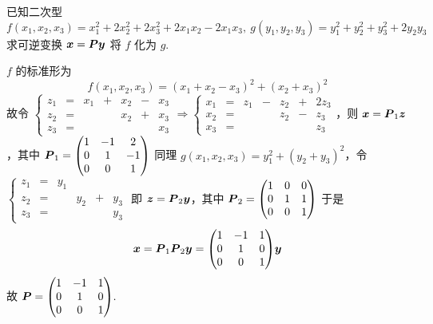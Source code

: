 \begin{example}
    已知二次型 \label{fx1x2x3gy1y2y3}$$f(x_1,x_2,x_3)=x_1^2+2x_2^2+2x_3^2+2x_1x_2-2x_1x_3,~g(y_1,y_2,y_3)=y_1^2+y_2^2+y_3^2+2y_2y_3$$
    求可逆变换 $\vb*{x}=\vb*{Py}$ 将 $f$ 化为 $g.$
\end{example}
\begin{solution}
    $f$ 的标准形为 $$f(x_1,x_2,x_3)=(x_1+x_2-x_3)^2+(x_2+x_3)^2$$
    故令 $\left\{\begin{matrix}
            z_1 & = & x_1 & + & x_2 & - & x_3 \\
            z_2 & = &     &   & x_2 & + & x_3 \\
            z_3 & = &     &   &     &   & x_3
        \end{matrix}\right.\Rightarrow \left\{\begin{matrix}
            x_1 & = & z_1 & - & z_2 & + & 2z_3 \\
            x_2 & = &     &   & z_2 & - & z_3  \\
            x_3 & = &     &   &     &   & z_3
        \end{matrix}\right.$，则 $\vb*{x}=\vb*{P}_1\vb*{z}$，其中 $\vb*{P}_1=\mqty(1&-1&2\\0&1&-1\\0&0&1)$
    同理 $g(x_1,x_2,x_3)=y_1^2+(y_2+y_3)^2$，令 $\left\{\begin{matrix}
            z_1 & = & y_1                 \\
            z_2 & = &     & y_2 & + & y_3 \\
            z_3 & = &     &     &   & y_3
        \end{matrix}\right.$ 即 $\vb*{z}=\vb*{P}_2\vb*{y}$，其中 $\vb*{P}_2=\mqty(1&0&0\\0&1&1\\0&0&1)$
    于是 $$\vb*{x}=\vb*{P}_1\vb*{P}_2\vb*{y}=\mqty(1&-1&1\\0&1&0\\0&0&1)\vb*{y}$$
    故 $\vb*{P}=\mqty(1&-1&1\\0&1&0\\0&0&1).$
\end{solution}


